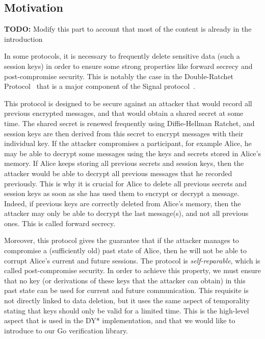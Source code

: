 \documentclass{article}
\newcommand{\TODO}[1]{\textcolor{RedViolet}{\textbf{TODO:} #1}}
\begin{document}
\subsection{Motivation}
\label{sec:motivation}

\TODO{Modify this part to account that most of the content is already in the introduction}

In some protocols, it is necessary to frequently delete sensitive data (such a session keys) in order to ensure some strong properties like forward secrecy and post-compromise security. This is notably the case in the Double-Ratchet Protocol~\cite{perrin2016double} that is a major component of the Signal protocol~\cite{marlinspike2016x3dh}. 

This protocol is designed to be secure against an attacker that would record all previous encrypted messages, and that would obtain a shared secret at some time. The shared secret is renewed frequently using Diffie-Hellman Ratchet, and session keys are then derived from this secret to encrypt messages with their individual key. If the attacker compromises a participant, for example Alice, he may be able to decrypt some messages using the keys and secrets stored in Alice's memory. If Alice keeps storing all previous secrets and session keys, then the attacker would be able to decrypt all previous messages that he recorded previously. This is why it is crucial for Alice to delete all previous secrets and session keys as soon as she has used them to encrypt or decrypt a message.
Indeed, if previous keys are correctly deleted from Alice's memory, then the attacker may only be able to decrypt the last message(s), and not all previous ones. This is called forward secrecy.

Moreover, this protocol gives the guarantee that if the attacker manages to compromise a (sufficiently old) past state of Alice, then he will not be able to corrupt Alice's current and future sessions. The protocol is \textit{self-reparable}, which is called post-compromise security. In order to achieve this property, we must ensure that no key (or derivations of these keys that the attacker can obtain) in this past state can be used for current and future communication. This requisite is not directly linked to data deletion, but it uses the same aspect of temporality stating that keys should only be valid for a limited time. This is the high-level aspect that is used in the DY* implementation, and that we would like to introduce to our Go verification library.
\end{document}
